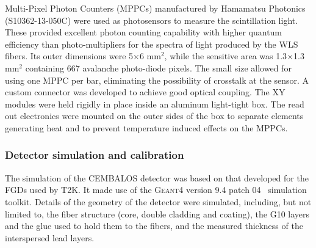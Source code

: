Multi-Pixel Photon Counters (MPPCs) manufactured by Hamamatsu Photonics (S10362-13-050C) were used as photosensors to measure the scintillation light. These provided excellent photon counting capability with higher quantum efficiency than photo-multipliers for the spectra of light produced by the WLS fibers. Its outer dimensions were 5$\times$6 mm$^2$, while the sensitive area was 1.3$\times$1.3 mm$^2$ containing 667 avalanche photo-diode pixels. The small size allowed for using one MPPC per bar, eliminating the possibility of crosstalk at the sensor. A custom connector was developed to achieve good optical coupling.
The XY modules were held rigidly in place inside an aluminum light-tight box. The read out electronics were mounted on the outer sides of the box to separate elements generating heat and to prevent temperature induced effects on the MPPCs. 


\subsubsection{\bf Detector simulation and calibration}\label{section:calibration}
The simulation of the CEMBALOS detector was based on that developed for the FGDs used by T2K. It made use of the \textsc{Geant4} version 9.4 patch 04~\cite{geant} simulation toolkit. Details of the geometry of the detector were simulated, including, but not limited to, the fiber structure (core, double cladding and coating), the G10 layers and the glue used to hold them to the fibers, and the measured thickness of the interspersed lead layers.

